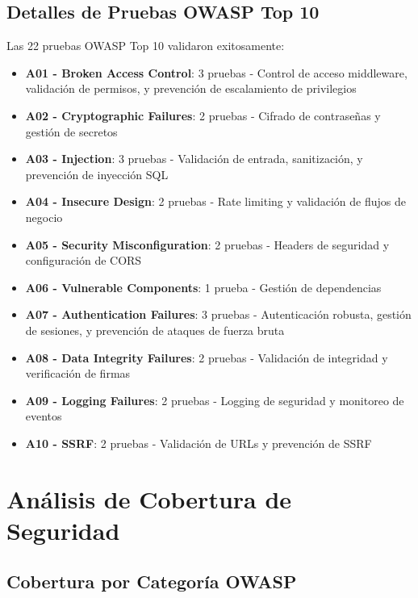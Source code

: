 \documentclass[12pt,a4paper]{article}
\begin{document}
\subsection{Detalles de Pruebas OWASP Top 10}

Las 22 pruebas OWASP Top 10 validaron exitosamente:

\begin{itemize}
    \item \textbf{A01 - Broken Access Control}: 3 pruebas - Control de acceso middleware, validación de permisos, y prevención de escalamiento de privilegios
    \item \textbf{A02 - Cryptographic Failures}: 2 pruebas - Cifrado de contraseñas y gestión de secretos
    \item \textbf{A03 - Injection}: 3 pruebas - Validación de entrada, sanitización, y prevención de inyección SQL
    \item \textbf{A04 - Insecure Design}: 2 pruebas - Rate limiting y validación de flujos de negocio
    \item \textbf{A05 - Security Misconfiguration}: 2 pruebas - Headers de seguridad y configuración de CORS
    \item \textbf{A06 - Vulnerable Components}: 1 prueba - Gestión de dependencias
    \item \textbf{A07 - Authentication Failures}: 3 pruebas - Autenticación robusta, gestión de sesiones, y prevención de ataques de fuerza bruta
    \item \textbf{A08 - Data Integrity Failures}: 2 pruebas - Validación de integridad y verificación de firmas
    \item \textbf{A09 - Logging Failures}: 2 pruebas - Logging de seguridad y monitoreo de eventos
    \item \textbf{A10 - SSRF}: 2 pruebas - Validación de URLs y prevención de SSRF
\end{itemize}

\section{Análisis de Cobertura de Seguridad}

\subsection{Cobertura por Categoría OWASP}
\end{document}
